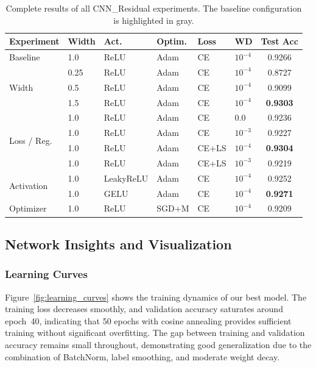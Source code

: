 \documentclass[11pt,a4paper]{article}
\begin{document}
\begin{table}[H]
\centering
\caption{Complete results of all CNN\_Residual experiments. The baseline configuration is highlighted in gray.}
\label{tab:all_results}
\begin{tabular}{@{}llllllc@{}}
\toprule
\textbf{Experiment} & \textbf{Width} & \textbf{Act.} & \textbf{Optim.} & \textbf{Loss} & \textbf{WD} & \textbf{Test Acc} \\
\midrule
\rowcolor{gray!15} Baseline & 1.0 & ReLU & Adam & CE & $10^{-4}$ & 0.9266 \\
\midrule
\multirow{3}{*}{Width} & 0.25 & ReLU & Adam & CE & $10^{-4}$ & 0.8727 \\
                        & 0.5  & ReLU & Adam & CE & $10^{-4}$ & 0.9099 \\
                        & 1.5  & ReLU & Adam & CE & $10^{-4}$ & \textbf{0.9303} \\
\midrule
\multirow{4}{*}{Loss / Reg.} & 1.0 & ReLU & Adam & CE & 0.0      & 0.9236 \\
                              & 1.0 & ReLU & Adam & CE & $10^{-3}$ & 0.9227 \\
                              & 1.0 & ReLU & Adam & CE+LS & $10^{-4}$ & \textbf{0.9304} \\
                              & 1.0 & ReLU & Adam & CE+LS & $10^{-3}$ & 0.9219 \\
\midrule
\multirow{2}{*}{Activation} & 1.0 & LeakyReLU & Adam & CE & $10^{-4}$ & 0.9252 \\
                             & 1.0 & GELU      & Adam & CE & $10^{-4}$ & \textbf{0.9271} \\
\midrule
Optimizer & 1.0 & ReLU & SGD+M & CE & $10^{-4}$ & 0.9209 \\
\bottomrule
\end{tabular}
\end{table}

\subsection{Network Insights and Visualization}

\subsubsection{Learning Curves}

Figure~\ref{fig:learning_curves} shows the training dynamics of our best model. The training loss decreases smoothly, and validation accuracy saturates around epoch~40, indicating that 50 epochs with cosine annealing provides sufficient training without significant overfitting. The gap between training and validation accuracy remains small throughout, demonstrating good generalization due to the combination of BatchNorm, label smoothing, and moderate weight decay.
\end{document}
